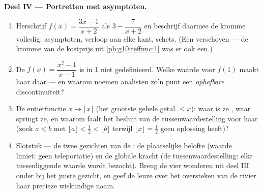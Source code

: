 \begin{problem}
\medskip
\noindent\textbf{Deel IV --- Portretten met asymptoten.}
\begin{enumerate}[resume]
  \item Herschrijf $f(x) = \dfrac{3x - 1}{x + 2}$ als
        $3 - \dfrac{7}{x + 2}$ en beschrijf daarmee de kromme volledig:
        asymptoten, verloop aan elke kant, schets. (Een verschoven 
        --- de kromme van de  kostprijs uit
        \cref{pb:g10:reffunc:1} was er ook een.)
  \item De  $f(x) = \dfrac{x^2 - 1}{x - 1}$ is in $1$ niet
        gedefinieerd. Welke waarde voor $f(1)$ maakt haar daar  --- en
        waarom noemen analisten zo'n punt een \emph{ophefbare}
        discontinuïteit?
  \item De entierfunctie $x \mapsto \lfloor x \rfloor$ (het grootste gehele
        getal $\leq x$): waar is ze , waar springt ze, en waarom faalt
        het besluit van de tussenwaardestelling voor haar (zoek $a < b$ met
        $\lfloor a \rfloor < \frac12 < \lfloor b \rfloor$ terwijl
        $\lfloor x \rfloor = \frac12$ geen oplossing heeft)?
  \item Slotstuk --- de twee gezichten van de : de plaatselijke
        belofte (waarde $=$ limiet: geen teleportatie) en de globale kracht
        (de tussenwaardestelling: elke tussenliggende waarde wordt bezocht).
        Breng de vier wonderen uit deel III onder bij het juiste gezicht, en
        geef de leuze over het oversteken van de rivier haar precieze
        wiskundige naam.
\end{enumerate}
\end{problem}
